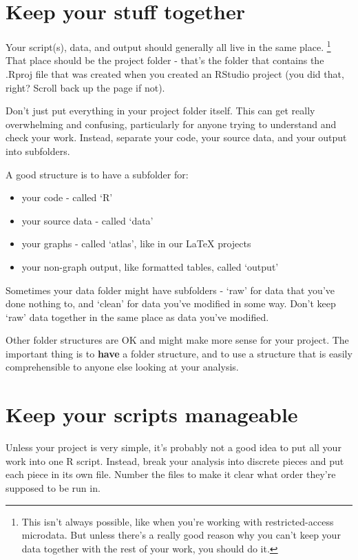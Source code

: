 \documentclass[]{book}
\providecommand{\tightlist}{%
  \setlength{\itemsep}{0pt}\setlength{\parskip}{0pt}}
\begin{document}
\hypertarget{keep-your-stuff-together}{%
\section{Keep your stuff together}\label{keep-your-stuff-together}}

Your script(s), data, and output should generally all live in the same place. \footnote{This isn't always possible, like when you're working with restricted-access microdata. But unless there's a really good reason why you can't keep your data together with the rest of your work, you should do it.} That place should be the project folder - that's the folder that contains the .Rproj file that was created when you created an RStudio project (you did that, right? Scroll back up the page if not).

Don't just put everything in your project folder itself. This can get really overwhelming and confusing, particularly for anyone trying to understand and check your work. Instead, separate your code, your source data, and your output into subfolders.

A good structure is to have a subfolder for:

\begin{itemize}
\tightlist
\item
  your code - called `R'
\item
  your source data - called `data'
\item
  your graphs - called `atlas', like in our LaTeX projects
\item
  your non-graph output, like formatted tables, called `output'
\end{itemize}

Sometimes your data folder might have subfolders - `raw' for data that you've done nothing to, and `clean' for data you've modified in some way. Don't keep `raw' data together in the same place as data you've modified.

Other folder structures are OK and might make more sense for your project. The important thing is to \textbf{have} a folder structure, and to use a structure that is easily comprehensible to anyone else looking at your analysis.

\hypertarget{manageable}{%
\section{Keep your scripts manageable}\label{manageable}}

Unless your project is very simple, it's probably not a good idea to put all your work into one R script. Instead, break your analysis into discrete pieces and put each piece in its own file. Number the files to make it clear what order they're supposed to be run in.
\end{document}
